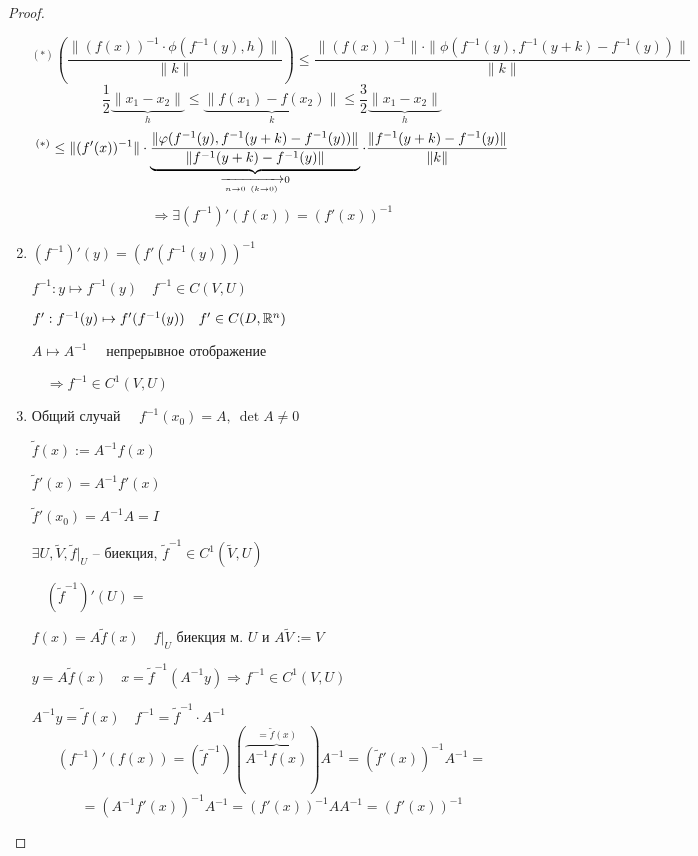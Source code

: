 \begin{proof}
\begin{enumerate}
\[                \]
                \[
                    ^{(*)}\left(\frac{\|(f(x))^{-1} \cdot \phi(f^{-1}(y), h)\|}{\|k\|}\right) \le \frac{\|\left(f(x)\right)^{-1}\| \cdot \|\phi(f^{-1}(y), f^{-1}(y + k) - f^{-1}(y))\|}{\|k\|}    
                \]
                \[
                    \frac12\underbrace{\|x_1 - x_2\|}_{h} \le \underbrace{\|f(x_1) - f(x_2)\|}_{k} \le \frac32\underbrace{\|x_1 - x_2\|}_{h}   
                \]
                \[
                    ^{(*)} \le \|(f'(x))^{-1}\| \cdot \underbrace{\frac{\|\phi(f^{-1}(y), f^{-1}(y + k) - f^{-1}(y))\|}{\|f^{-1}(y + k) - f^{-1}(y)\|}}_{\xrightarrow[n \rightarrow 0 \newline (k \rightarrow 0)]{} 0} \cdot \frac{\|f^{-1}(y+k) - f^{-1}(y)\|}{\|k\|}
                \]
                \[
                    \Rightarrow \exists (f^{-1})'(f(x)) = (f'(x))^{-1}    
                \]
            \item $\left(f^{-1}\right)'(y) = \left(f'(f^{-1}(y))\right)^{-1}$
                \par $f^{-1} : y \mapsto f^{-1}(y) \quad f^{-1} \in C(V, U)$
                \par $f' : f^{-1}(y) \mapsto f'(f^{-1}(y)) \quad f' \in C(D, \mathbb{R}^n)$
                \par $A \mapsto A^{-1} \quad$ непрерывное отображение
                \par $\quad \Rightarrow f^{-1} \in C^1(V, U)$
            \item Общий случай $\quad f^{-1}(x_0) = A, \ \det A \not= 0$
                \par $\tilde f(x) := A^{-1}f(x)$
                \par $\tilde f'(x) = A^{-1}f'(x)$
                \par $\tilde f'(x_0) = A^{-1}A = I$
                \par $\exists U, \tilde V, \tilde f\big|_U$ -- биекция, $\tilde f^{-1} \in C^1(\tilde V, U)$
                \par $\quad (\tilde f^{-1})'(U) = $
                \par $f(x) = A \tilde f(x) \quad f\big|_U$ биекция м. $U$ и $A \tilde V := V$
                \par $y = A \tilde f(x) \quad x = \tilde f^{-1}(A^{-1} y) \Rightarrow f^{-1} \in C^1(V, U)$
                \par $A^{-1}y = \tilde f(x) \quad f^{-1} = \tilde f^{-1} \cdot A^{-1}$
                \pagebreak
                \[
                    (f^{-1})'(f(x)) = (\tilde f^{-1})(\overbrace{A^{-1}f(x)}^{=\tilde f(x)}) A^{-1} = (\tilde f'(x))^{-1} A^{-1} =
                \]
                \[
                    = (A^{-1} f'(x))^{-1}A^{-1} = (f'(x))^{-1} AA^{-1} = (f'(x))^{-1}    
                \]
        \end{enumerate}
    \end{proof}

